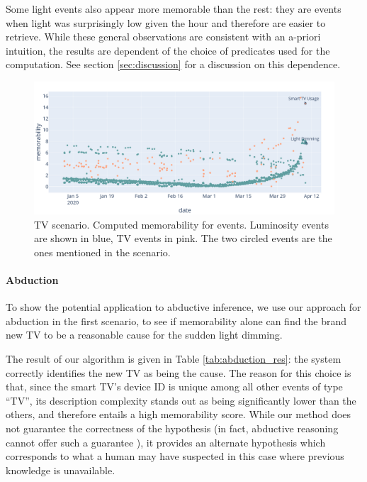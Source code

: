 \documentclass[entropy,article,submit,moreauthors,pdftex]{Definitions/mdpi}
\begin{document}
Some light events also appear more memorable than the rest: they are events when light was surprisingly low given the hour and therefore are easier to retrieve. While these general observations are consistent with an a-priori intuition, the results are dependent of the choice of predicates used for the computation. See section \ref{sec:discussion} for a discussion on this dependence.


\begin{figure}[!ht]
    \centering
    \includegraphics[width=.9\linewidth]{figures/memo_scenar_1.png}
    \caption{TV scenario. Computed memorability for events. Luminosity events are shown in blue, TV events in pink. The two circled events are the ones mentioned in the scenario.}
    \label{fig:scenar1_complexity}
\end{figure}

\paragraph{Abduction}
To show the potential application to abductive inference, we use our approach for abduction in the first scenario, to see if memorability alone can find the brand new TV to be a reasonable cause for the sudden light dimming.

The result of our algorithm is given in Table \ref{tab:abduction_res}: the system correctly identifies the new TV as being the cause. The reason for this choice is that, since the smart TV's device ID is unique among all other events of type ``TV'', its description complexity stands out as being significantly lower than the others, and therefore entails a high memorability score. While our method does not guarantee the correctness of the hypothesis (in fact, abductive reasoning cannot offer such a guarantee \cite{magnani_abduction_2011}), it provides an alternate hypothesis which corresponds to what a human may have suspected in this case where previous knowledge is unavailable.
\end{document}
